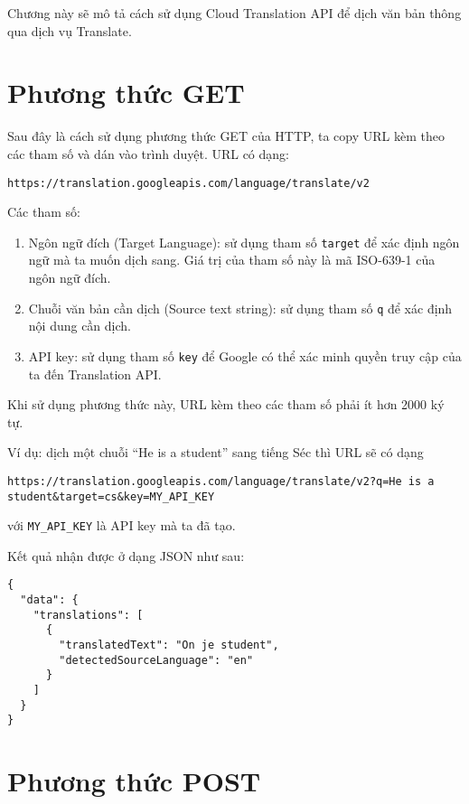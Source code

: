 \documentclass[../thesis.tex]{subfiles}
\begin{document}
Chương này sẽ mô tả cách sử dụng Cloud Translation API để dịch văn bản thông qua dịch vụ Translate.

\section{Phương thức GET}
Sau đây là cách sử dụng phương thức GET của HTTP, ta copy URL kèm theo các tham số và dán vào trình duyệt. URL có dạng:

\begin{lstlisting}[numbers=none, frame=single,xleftmargin=0.15cm,xrightmargin=0.15cm]
https://translation.googleapis.com/language/translate/v2
\end{lstlisting}

Các tham số:
\begin{enumerate}
  \item Ngôn ngữ đích (Target Language): sử dụng tham số \lstinline{target} để xác định ngôn ngữ mà ta muốn dịch sang. Giá trị của tham số này là mã ISO-639-1 của ngôn ngữ đích.
  \item Chuỗi văn bản cần dịch (Source text string): sử dụng tham số \lstinline{q} để xác định nội dung cần dịch.
  \item API key: sử dụng tham số \lstinline{key} để Google có thể xác minh quyền truy cập của ta đến Translation API.
\end{enumerate}

Khi sử dụng phương thức này, URL kèm theo các tham số phải ít hơn 2000 ký tự. 

Ví dụ: dịch một chuỗi ``He is a student'' sang tiếng Séc thì URL sẽ có dạng

\begin{lstlisting}[numbers=none, frame=single,xleftmargin=0.15cm,xrightmargin=0.15cm]
https://translation.googleapis.com/language/translate/v2?q=He is a student&target=cs&key=MY_API_KEY
\end{lstlisting}
với \lstinline{MY_API_KEY} là API key mà ta đã tạo.

Kết quả nhận được ở dạng JSON như sau:

\begin{lstlisting}[numbers=none, frame=single,xleftmargin=0.15cm,xrightmargin=0.15cm]
{
  "data": {
    "translations": [
      {
        "translatedText": "On je student",
        "detectedSourceLanguage": "en"
      }
    ]
  }
}
\end{lstlisting}

\section{Phương thức POST}
\end{document}
